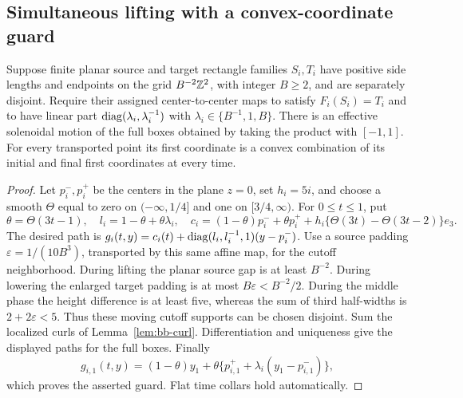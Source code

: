 \subsection{Simultaneous lifting with a convex-coordinate guard}
\label{bc:simultaneous-section}
\begin{proposition}\label{bc:simultaneous}
Suppose finite planar source and target rectangle families $S_i,T_i$
have positive side lengths and endpoints on the grid $B^{-2}\mathbb Z^2$,
with integer $B\ge2$, and are separately
disjoint. Require their assigned center-to-center maps to satisfy
$F_i(S_i)=T_i$ and to have linear part $\operatorname{diag}(\lambda_i,\lambda_i^{-1})$ with
$\lambda_i\in\{B^{-1},1,B\}$. There is an effective solenoidal motion
of the full boxes obtained by taking the product with $[-1,1]$.
For every transported point its first coordinate is a convex combination
of its initial and final first coordinates at every time.
\end{proposition}
\begin{proof}\label{bc:simultaneous-proof}
Let $p_i^-,p_i^+$ be the centers in the plane $z=0$, set $h_i=5i$, and
choose a smooth $\Theta$ equal to zero on $(-\infty,1/4]$ and one on
$[3/4,\infty)$. For $0\le t\le1$, put
\[
 \theta=\Theta(3t-1),\quad l_i=1-\theta+\theta\lambda_i,
 \quad c_i=(1-\theta)p_i^-+\theta p_i^+
       +h_i\{\Theta(3t)-\Theta(3t-2)\}e_3.
\]
The desired path is $g_i(t,y)=c_i(t)+\operatorname{diag}(l_i,l_i^{-1},1)(y-p_i^-)$.
Use a source padding $\varepsilon=1/(10B^3)$, transported by this same
affine map, for the cutoff neighborhood. During lifting the planar
source gap is at least $B^{-2}$. During lowering the enlarged target
padding is at most $B\varepsilon<B^{-2}/2$. During the middle phase
the height difference is at least five, whereas the sum of third
half-widths is $2+2\varepsilon<5$. Thus these moving cutoff supports
can be chosen disjoint. Sum the localized curls of
Lemma~\ref{lem:bb-curl}. Differentiation and uniqueness give the displayed
paths for the full boxes. Finally
\[
 g_{i,1}(t,y)=(1-\theta)y_1+
 \theta\{p_{i,1}^++\lambda_i(y_1-p_{i,1}^-)\},
\]
which proves the asserted guard. Flat time collars hold automatically.
\end{proof}

